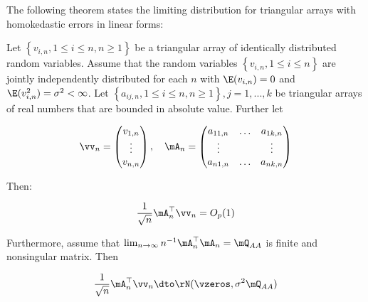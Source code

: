 \documentclass[english,12pt]{book}\usepackage[]{graphicx}\usepackage[]{xcolor}
\begin{document}
The following theorem states the limiting distribution for triangular arrays with homokedastic errors in linear forms:

\begin{theorem}\label{teo:CLT_tri_arr}
Let $\left\lbrace v_{i,n}, 1 \leq i \leq n, n\geq 1\right\rbrace $ be a triangular array of identically distributed random variables. Assume that the random variables $\left\lbrace v_{i,n}, 1 \leq i \leq n\right\rbrace$ are jointly independently distributed for each $n$ with $\E(v_{i,n})= 0$ and $\E(v_{i,n}^2) = \sigma^2 < \infty$. Let $\left\lbrace a_{ij,n}, 1 \leq i \leq n, n\geq 1\right\rbrace, j = 1,...,k$ be triangular arrays of real numbers that are bounded in absolute value. Further let

\begin{equation*}
  \vv_n = \begin{pmatrix}
            v_{1, n} \\
            \vdots \\
            v_{n,n}
          \end{pmatrix}, \quad
          \mA_n = \begin{pmatrix}
            a_{11,n} & \hdots & a_{1k, n} \\
            \vdots &         & \vdots \\
            a_{n1,n} & \hdots & a_{nk, n}
          \end{pmatrix}
\end{equation*}

Then:

\begin{equation*}
\frac{1}{\sqrt{n}}\mA_n^\top\vv_n = O_p(1)
\end{equation*}

Furthermore, assume that $\lim_{n\to\infty}n^{-1}\mA^\top_n\mA_n = \mQ_{AA}$ is finite and nonsingular matrix. Then

\begin{equation*}
\frac{1}{\sqrt{n}}\mA_n^\top\vv_n \dto \rN(\vzeros, \sigma^2 \mQ_{AA})
\end{equation*}
\end{theorem}
\end{document}
